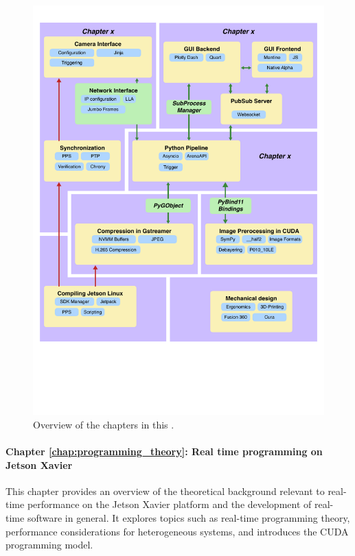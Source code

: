 \begin{figure}[H]
    \includegraphics[width=\textwidth]{chapters/10_intro/chapter_overview.pdf}
    \caption{Overview of the chapters in this \master.}
    \label{fig:overview}
\end{figure}


\paragraph{Chapter \ref{chap:programming_theory}: Real time programming on Jetson Xavier}
This chapter provides an overview of the theoretical background relevant to real-time performance on the Jetson Xavier platform and the development of real-time software in general.
It explores topics such as real-time programming theory, performance considerations for heterogeneous systems, and introduces the CUDA programming model.

